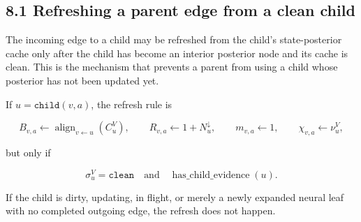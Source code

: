 \documentclass[11pt]{article}
\newcommand{\Align}{\operatorname{align}}
\begin{document}
\subsection*{8.1 Refreshing a parent edge from a clean child}

The incoming edge to a child may be refreshed from the child's state-posterior
cache only after the child has become an interior posterior node and its cache is
clean. This is the mechanism that prevents a parent from using a child whose
posterior has not been updated yet.

If \(u=\texttt{child}(v,a)\), the refresh rule is

\[
B_{v,a}
\gets
\Align_{v\leftarrow u}(C^V_u),
\qquad
R_{v,a}\gets 1+N^\downarrow_u,
\qquad
m_{v,a}\gets 1,
\qquad
\chi_{v,a}\gets \nu^V_u,
\]

but only if

\[
\sigma^V_u=\texttt{clean}
\quad\text{and}\quad
\operatorname{has\_child\_evidence}(u).
\]

If the child is dirty, updating, in flight, or merely a newly expanded neural
leaf with no completed outgoing edge, the refresh does not happen.
\end{document}
